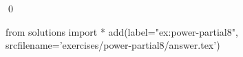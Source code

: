 
\begin{ex} 
  \label{ex:power-partial8}
  
  \qed
\end{ex} 
\begin{python0}
from solutions import *
add(label="ex:power-partial8",
    srcfilename='exercises/power-partial8/answer.tex') 
\end{python0}
